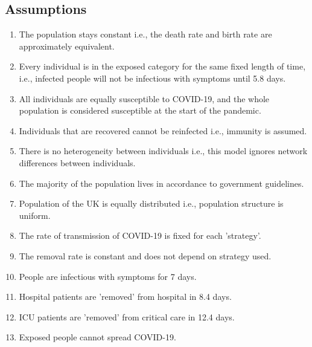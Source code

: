 \documentclass[11pt]{article}
\begin{document}
\subsection{Assumptions}
\begin{enumerate}
\item The population stays constant i.e., the death rate and birth rate are approximately equivalent.
\item Every individual is in the exposed category for the same fixed length of time, i.e., infected people will not be infectious with symptoms until 5.8 days\citep{10.1093/cid/ciab746}.
\item All individuals are equally susceptible to COVID-19, and the whole population is considered susceptible at the start of the pandemic.
\item Individuals that are recovered cannot be reinfected i.e., immunity is assumed.
\item There is no heterogeneity between individuals i.e., this model ignores network differences between individuals. 
\item The majority of the population lives in accordance to government guidelines.
\item Population of the UK is equally distributed i.e., population structure is uniform.
\item The rate of transmission of COVID-19 is fixed for each 'strategy'.
\item The removal rate is constant and does not depend on strategy used.
\item People are infectious with symptoms for 7 days\citep{he2020temporal}.
\item Hospital patients are 'removed' from hospital in 8.4 days\citep{vekaria2021hospital}.
\item ICU patients are 'removed' from critical care in 12.4 days\citep{vekaria2021hospital}. 
\item Exposed people cannot spread COVID-19.
\end{enumerate}
\end{document}
